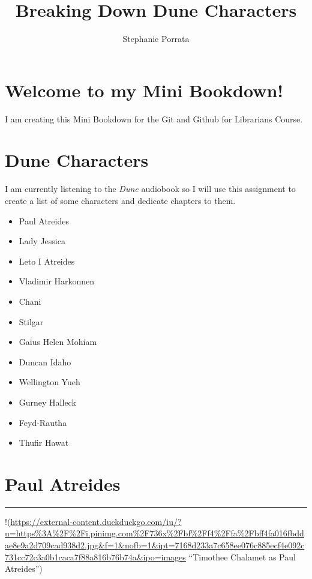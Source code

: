 \documentclass[
  openany]{book}
\title{Breaking Down Dune Characters}
\author{Stephanie Porrata}
\date{}
\providecommand{\tightlist}{%
  \setlength{\itemsep}{0pt}\setlength{\parskip}{0pt}}
\begin{document}
\maketitle

{
\setcounter{tocdepth}{1}
\tableofcontents
}
\hypertarget{welcome-to-my-mini-bookdown}{%
\chapter{Welcome to my Mini Bookdown!}\label{welcome-to-my-mini-bookdown}}

I am creating this Mini Bookdown for the Git and Github for Librarians Course.

\hypertarget{dune-characters}{%
\chapter{Dune Characters}\label{dune-characters}}

I am currently listening to the \emph{Dune} audiobook so I will use this assignment to create a list of some characters and dedicate chapters to them.

\begin{itemize}
\tightlist
\item
  Paul Atreides
\item
  Lady Jessica
\item
  Leto I Atreides
\item
  Vladimir Harkonnen
\item
  Chani
\item
  Stilgar
\item
  Gaius Helen Mohiam
\item
  Duncan Idaho
\item
  Wellington Yueh
\item
  Gurney Halleck
\item
  Feyd-Rautha
\item
  Thufir Hawat
\end{itemize}

\hypertarget{paul-atreides}{%
\chapter{Paul Atreides}\label{paul-atreides}}

\begin{center}\rule{0.5\linewidth}{0.5pt}\end{center}

!(\url{https://external-content.duckduckgo.com/iu/?u=https\%3A\%2F\%2Fi.pinimg.com\%2F736x\%2Fbf\%2Ff4\%2Ffa\%2Fbff4fa016fbddae8e9a2d709cad938d2.jpg\&f=1\&nofb=1\&ipt=7168d233a7c658ee076c885ecf4e092c731cc72c3a0b1caca7f88a816b76b74a\&ipo=images} ``Timothee Chalamet as Paul Atreides'')
\end{document}

